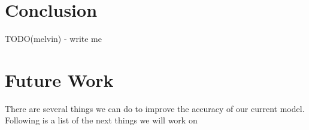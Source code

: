 \documentclass[conference]{IEEEtran}
\begin{document}
\section{Conclusion}
TODO(melvin) - write me

\section{Future Work}
There are several things we can do to improve the accuracy of our current model.  Following is a list of the next things we will work on





\end{document}
